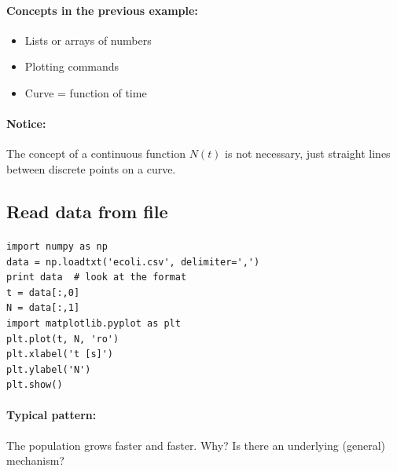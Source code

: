 \documentclass[%
twoside,                 %
final,                   %
10pt]{article}
\begin{document}
\noindent




\paragraph{Concepts in the previous example:}
\begin{itemize}
 \item Lists or arrays of numbers

 \item Plotting commands

 \item Curve = function of time
\end{itemize}

\noindent




\paragraph{Notice:}
The concept of a continuous function $N(t)$ is not necessary,
just straight lines between discrete points on a curve.



\subsection*{Read data from file}


\paragraph{}
\begin{verbatim}
import numpy as np
data = np.loadtxt('ecoli.csv', delimiter=',')
print data  # look at the format
t = data[:,0]
N = data[:,1]
import matplotlib.pyplot as plt
plt.plot(t, N, 'ro')
plt.xlabel('t [s]')
plt.ylabel('N')
plt.show()
\end{verbatim}




\paragraph{Typical pattern:}
The population grows faster and faster. Why? Is there an
underlying (general) mechanism?
\end{document}
